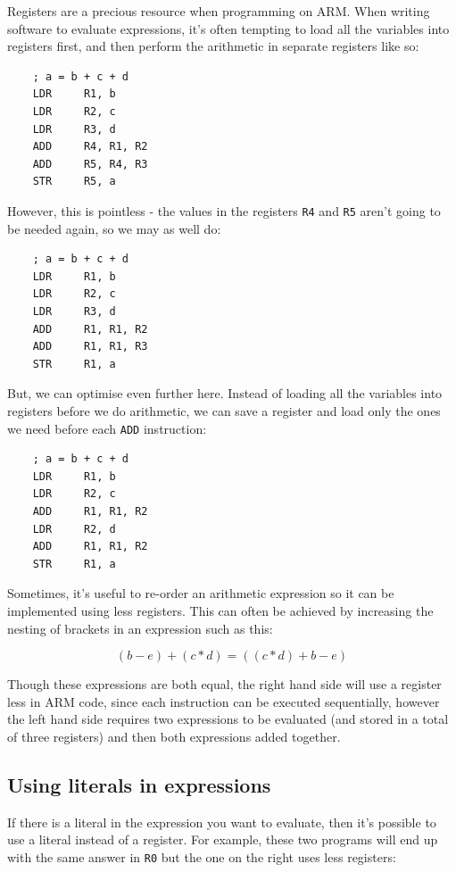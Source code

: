 \documentclass{article}
\begin{document}
Registers are a precious resource when programming on ARM. When writing software to evaluate expressions, it's often tempting to load all the variables into registers first, and then perform the arithmetic in separate registers like so:

\begin{verbatim}
	; a = b + c + d
	LDR 	R1, b
	LDR 	R2, c
	LDR 	R3, d
	ADD 	R4, R1, R2
	ADD 	R5, R4, R3
	STR 	R5, a
\end{verbatim}

However, this is pointless - the values in the registers {\tt R4} and {\tt R5} aren't going to be needed again, so we may as well do:

\begin{verbatim}
	; a = b + c + d
	LDR 	R1, b
	LDR 	R2, c
	LDR 	R3, d
	ADD 	R1, R1, R2
	ADD 	R1, R1, R3
	STR 	R1, a
\end{verbatim}

But, we can optimise even further here. Instead of loading all the variables into registers before we do arithmetic, we can save a register and load only the ones we need before each {\tt ADD} instruction:

\begin{verbatim}
	; a = b + c + d
	LDR 	R1, b
	LDR 	R2, c
	ADD 	R1, R1, R2
	LDR 	R2, d
	ADD 	R1, R1, R2
	STR 	R1, a
\end{verbatim}

Sometimes, it's useful to re-order an arithmetic expression so it can be implemented using less registers. This can often be achieved by increasing the nesting of brackets in an expression such as this:

\[
	(b - e) + (c * d) = ((c * d) + b - e)
\]

Though these expressions are both equal, the right hand side will use a register less in ARM code, since each instruction can be executed sequentially, however the left hand side requires two expressions to be evaluated (and stored in a total of three registers) and then both expressions added together.

\subsection{Using literals in expressions}

If there is a literal in the expression you want to evaluate, then it's possible to use a literal instead of a register. For example, these two programs will end up with the same answer in {\tt R0} but the one on the right uses less registers:
\end{document}
